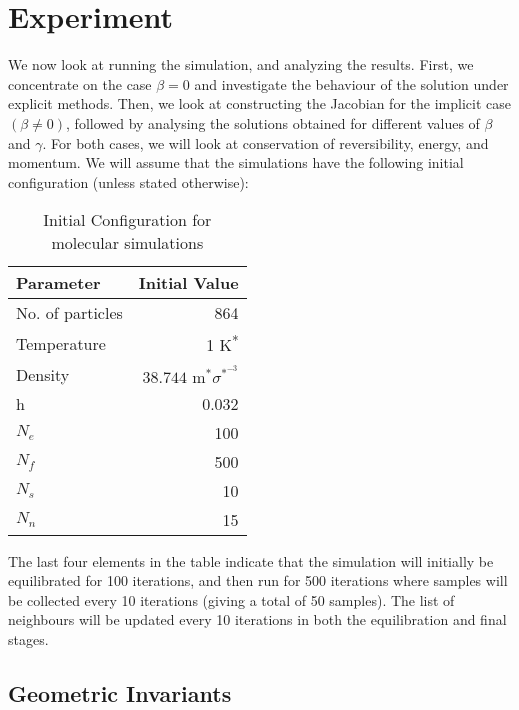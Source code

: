 \documentclass[../Main.tex]{subfiles}
\begin{document}
\section{Experiment}
We now look at running the simulation, and analyzing the results. First, we concentrate on the case $\beta = 0$ and investigate the behaviour of the solution under explicit methods. Then, we look at constructing the Jacobian for the implicit case $\left(\beta\neq 0\right)$, followed by analysing the solutions obtained for different values of $\beta$ and $\gamma$. For both cases, we will look at conservation of reversibility, energy, and momentum.
We will assume that the simulations have the following initial configuration (unless stated otherwise):

\begin{table}[H]
	\centering
	\begin{tabular}{ |l|r| }
		\hline
		Parameter & Initial Value \\
		\hline
		No. of particles & 864 \\
		Temperature & 1 K\textsuperscript{*} \\
		Density & $38.744 \mbox{ m}^{*}\sigma^{*^{-3}}$ \\
		h & 0.032 \\
		$N_{e}$ & 100 \\
		$N_{f}$ & 500 \\
		$N_{s}$ & 10 \\
		$N_{n}$ & 15 \\
		\hline
	\end{tabular}
	\caption{Initial Configuration for molecular simulations}
	\label{tbl:initial_configuration_simulation}
\end{table}

The last four elements in the table indicate that the simulation will initially be equilibrated for 100 iterations, and then run for 500 iterations where samples will be collected every 10 iterations (giving a total of 50 samples). The list of neighbours will be updated every 10 iterations in both the equilibration and final stages.

\subsection{Geometric Invariants}
\end{document}
